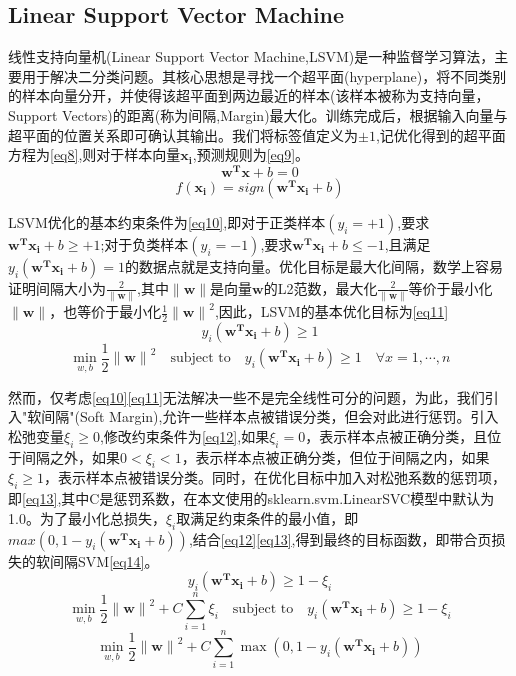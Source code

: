 \documentclass{article}
\begin{document}
\subsection{Linear Support Vector Machine}
线性支持向量机(Linear Support Vector Machine,LSVM)是一种监督学习算法，主要用于解决二分类问题。其核心思想是寻找一个超平面(hyperplane)，将不同类别的样本向量分开，并使得该超平面到两边最近的样本(该样本被称为支持向量，Support Vectors)的距离(称为间隔,Margin)最大化。训练完成后，根据输入向量与超平面的位置关系即可确认其输出。我们将标签值定义为$\pm1$,记优化得到的超平面方程为\eqref{eq8},则对于样本向量$\boldsymbol{x_i}$,预测规则为\eqref{eq9}。
\begin{equation}
    \boldsymbol{w^Tx}+b=0 \label{eq8}
\end{equation}
\begin{equation}
    f(\boldsymbol{x_i})=sign(\boldsymbol{w^Tx_i}+b) \label{eq9}
\end{equation}

LSVM优化的基本约束条件为\eqref{eq10},即对于正类样本$(y_i=+1)$,要求$\boldsymbol{w^Tx_i}+b\geq+1$;对于负类样本$(y_i=-1)$,要求$\boldsymbol{w^Tx_i}+b\leq-1$,且满足$y_i(\boldsymbol{w^Tx_i}+b)=1$的数据点就是支持向量。优化目标是最大化间隔，数学上容易证明间隔大小为$\frac{2}{\|\boldsymbol{w}\|}$,其中$\|\boldsymbol{w}\|$是向量$\boldsymbol{w}$的L2范数，最大化$\frac{2}{\|\boldsymbol{w}\|}$等价于最小化$\|\boldsymbol{w}\|$，也等价于最小化$\frac{1}{2}{\|\boldsymbol{w}\|}^2$,因此，LSVM的基本优化目标为\eqref{eq11}
\begin{equation}
    y_i(\boldsymbol{w^Tx_i}+b)\geq1 \label{eq10}
\end{equation}
\begin{equation}
    \min_{w,b}\frac{1}{2}{\|\boldsymbol{w}\|}^2 \quad \text{subject to} \quad y_i(\boldsymbol{w^Tx_i}+b)\geq1 \quad \forall x=1 , \cdots , n \label{eq11}
\end{equation}

然而，仅考虑\eqref{eq10}\eqref{eq11}无法解决一些不是完全线性可分的问题，为此，我们引入"软间隔"(Soft Margin),允许一些样本点被错误分类，但会对此进行惩罚。引入松弛变量$\xi_i\geq0$,修改约束条件为\eqref{eq12},如果$\xi_i=0$，表示样本点被正确分类，且位于间隔之外，如果$0<\xi_i<1$，表示样本点被正确分类，但位于间隔之内，如果$\xi_i\geq1$，表示样本点被错误分类。同时，在优化目标中加入对松弛系数的惩罚项，即\eqref{eq13},其中C是惩罚系数，在本文使用的sklearn.svm.LinearSVC模型中默认为1.0。为了最小化总损失，$\xi_i$取满足约束条件的最小值，即$max(0,1-y_i(\boldsymbol{w^Tx_i}+b))$,结合\eqref{eq12}\eqref{eq13},得到最终的目标函数，即带合页损失的软间隔SVM\eqref{eq14}。
\begin{equation}
    y_i(\boldsymbol{w^Tx_i}+b)\geq1-\xi_i \label{eq12}
\end{equation}
\begin{equation}
    \min_{w,b}\frac{1}{2}{\|\boldsymbol{w}\|}^2+C\sum_{i=1}^{n}\xi_i \quad \text{subject to} \quad y_i(\boldsymbol{w^Tx_i}+b)\geq1-\xi_i \label{eq13}
\end{equation}
\begin{equation}
    \min_{w,b}\frac{1}{2}{\|\boldsymbol{w}\|}^2+C\sum_{i=1}^{n}\max(0,1-y_i(\boldsymbol{w^Tx_i}+b)) \label{eq14}
\end{equation}
\end{document}
